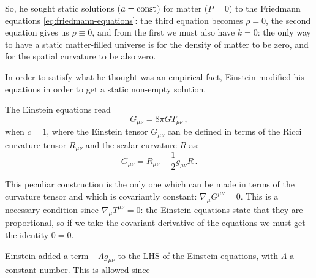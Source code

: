 \documentclass[main.tex]{subfiles}
\begin{document}
So, he sought static solutions (\(a = \text{const}\)) for matter (\(P=0\)) to the Friedmann equations \eqref{eq:friedmann-equations}:
the third equation becomes \(\dot{\rho}= 0\), the second equation gives us \(\rho \equiv 0\), and from the first we must also have \(k=0\): the only way to have a static matter-filled universe is for the density of matter to be zero, and for the spatial curvature to be also zero.

In order to satisfy what he thought was an empirical fact, Einstein modified his equations in order to get a static non-empty solution.

The Einstein equations read 
%
\begin{equation}
  G_{\mu \nu } = 8 \pi G T_{\mu \nu }
\,,
\end{equation}
%
when \(c=1\), where the Einstein tensor \(G_{\mu \nu }\) can be defined in terms of the Ricci curvature tensor \(R_{\mu \nu }\) and the scalar curvature \(R\) as:
%
\begin{equation}
  G_{ \mu \nu } = R_{\mu \nu } - \frac{1}{2} g_{\mu \nu }R
\,.
\end{equation}

This peculiar construction is the only one which can be made in terms of the curvature tensor and which is covariantly constant: \(\nabla_{\mu } G^{\mu \nu } = 0\). 
This is a necessary condition since \(\nabla_{\mu } T^{\mu \nu }=0\): the Einstein equations state that they are proportional, so if we take the covariant derivative of the equations we must get the identity \(0=0\).


Einstein added a term \(- \Lambda g_{\mu \nu }\) to the LHS of the Einstein equations, with \(\Lambda \) a constant number. This is allowed since 
\end{document}
